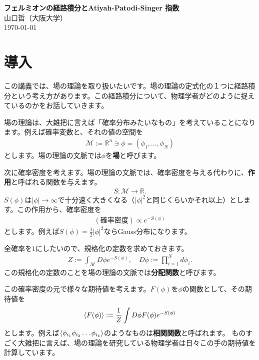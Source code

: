 \documentclass[paper=a4, fontsize=12pt, line_length=16cm, number_of_lines=33,dvipdfmx]{jlreq}
\numberwithin{equation}{section}
\newcommand{\Rb}{\mathbb{R}}
\newcommand{\strong}[1]{\textsf{\bfseries #1}}
\newcommand{\Mcal}{\mathcal{M}}
\begin{document}
\begin{center}
  {\sffamily\bfseries\Large フェルミオンの経路積分とAtiyah-Patodi-Singer 指数}\\
  山口哲（大阪大学）\\
  \today
\end{center}

\tableofcontents


\section{導入}
この講義では、場の理論を取り扱いたいです。場の理論の定式化の１つに経路積分という考え方があります。この経路積分について、物理学者がどのように捉えているのかをお話していきます。

場の理論は、大雑把に言えば「確率分布みたいなもの」を考えていることになります。例えば確率変数と、それの値の空間を
\begin{align}
  \Mcal:=\Rb^n\ni \phi=(\phi_1,\dots,\phi_N)
\end{align}
とします。場の理論の文脈では$\phi$を\strong{場}と呼びます。

次に確率密度を考えます。場の理論の文脈では、確率密度を与える代わりに、\strong{作用}と呼ばれる関数を与えます。
\begin{align}
  S:\Mcal\to \Rb.
\end{align}
$S(\phi)$は$|\phi|\to \infty$で十分速く大きくなる（$|\phi|^2$と同じくらいかそれ以上）とします。この作用から、確率密度を
\begin{align}
  (\text{確率密度})\propto e^{-S(\phi)}
\end{align}
とします。例えば$S(\phi)=\frac12|\phi|^2$ならGauss分布になります。

全確率を$1$にしたいので、規格化の定数を求めておきます。
\begin{align}
  Z:=\int_{\Mcal}D\phi e^{-S(\phi)},\quad D\phi:=\prod_{i=1}^{N}d\phi_i.
\end{align}
この規格化の定数のことを場の理論の文脈では\strong{分配関数}と呼びます。

この確率密度の元で様々な期待値を考えます。$F(\phi)$を$\phi$の関数として、その期待値を
\begin{align}
  \expval{F(\phi)}:=\frac{1}{Z}\int D\phi F(\phi)e^{-S(\phi)}
\end{align}
とします。例えば$\expval{\phi_{i_1}\phi_{i_2}\dots \phi_{i_k}}$のようなものは\strong{相関関数}と呼ばれます。
ものすごく大雑把に言えば、場の理論を研究している物理学者は日々この手の期待値を計算しています。
\end{document}
